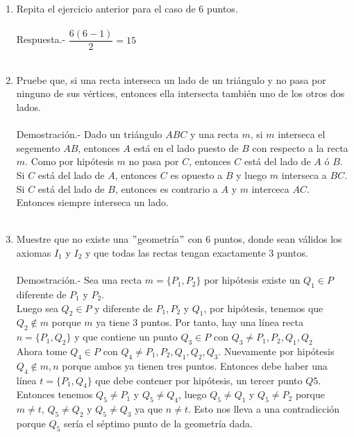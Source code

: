 \begin{enumerate}
    \item Repita el ejercicio anterior para el caso de $6$ puntos.\\\\
    Respuesta.-\; $\dfrac{6(6-1)}{2}=15$\\\\

    \item Pruebe que, si una recta interseca un lado de un triángulo y no pasa por ninguno de sus vértices, entonces ella intersecta también uno de los otros dos lados.\\\\
    Demostración.-\; Dado un triángulo $ABC$ y una recta $m$, si $m$ interseca el segemento $AB$, entonces $A$ está en el lado puesto de $B$ con respecto a la recta $m$. Como por hipótesis $m$ no pasa por $C$, entonces $C$ está del lado de $A$ ó $B$.\\
    Si $C$ está del lado de $A$, entonces $C$ es opuesto a $B$ y luego $m$ interseca a $BC$.\\
    Si $C$ está del lado de $B$, entonces es contrario a $A$ y $m$ interceca $AC$.\\
    Entonces siempre interseca un lado.\\\\

    \item Muestre que no existe una $"$geometría$"$ con $6$ puntos, donde sean válidos los axiomas $I_1$ y $I_2$ y que todas las rectas tengan exactamente $3$ puntos.\\\\   
    Demostración.-\; Sea una recta $m=\lbrace P_1,P_2 \rbrace$ por hipótesis existe un $Q_1 \in P$ diferente de $P_1$ y $P_2$.\\
    Luego sea $Q_2 \in P$ y diferente de $P_1,P_2$ y $Q_1$, por hipótesis, tenemos que $Q_2 \notin m$ porque $m$ ya tiene 3 puntos. Por tanto, hay una línea recta $n=\lbrace P_1,Q_2 \rbrace$ y que contiene un punto $Q_3\in P$ con $Q_3\neq P_1,P_2,Q_1,Q_2$\\
    Ahora tome $Q_4 \in P$ con $Q_4 \neq P_1,P_2,Q_1, Q_2,Q_3$. Nuevamente por hipótesis $Q_4 \notin m,n$ porque ambos ya tienen tres puntos. Entonces debe haber una línea $t=\lbrace P_1,Q_4 \rbrace$ que debe contener por hipótesis, un tercer punto $Q5$. Entonces tenemos $Q_5 \neq P_1$ y $Q_5 \neq Q_4$, luego $Q_5 \neq Q_1$ y $Q_5\neq P_2$ porque $m\neq t$, $Q_5\neq Q_2$ y $Q_5\neq Q_3$ ya que $n\neq t$. Esto nos lleva a una contradicción porque $Q_5$ sería el séptimo punto de la geometría dada.\\\\


\end{enumerate}
